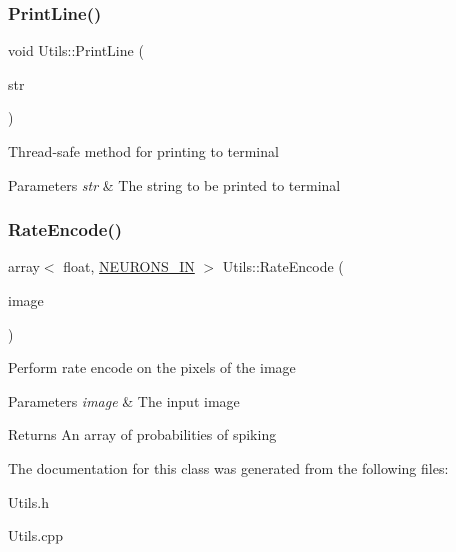 \subsubsection{\texorpdfstring{Print\+Line()}{PrintLine()}}
{\footnotesize\ttfamily void Utils\+::\+Print\+Line (\begin{DoxyParamCaption}\item[{string \&\&}]{str }\end{DoxyParamCaption})\hspace{0.3cm}{\ttfamily [static]}}

Thread-\/safe method for printing to terminal 
\begin{DoxyParams}{Parameters}
{\em str} & The string to be printed to terminal \\
\hline
\end{DoxyParams}
\mbox{\label{class_utils_a35864e66802eaecfd09f42b6bb6078d4}} 
\subsubsection{\texorpdfstring{Rate\+Encode()}{RateEncode()}}
{\footnotesize\ttfamily array$<$ float, \mbox{\hyperlink{_constants_8h_aefc2426e4681da445c7793c98a83c532}{N\+E\+U\+R\+O\+N\+S\+\_\+\+IN}} $>$ Utils\+::\+Rate\+Encode (\begin{DoxyParamCaption}\item[{array$<$ unsigned char, \mbox{\hyperlink{_constants_8h_aefc2426e4681da445c7793c98a83c532}{N\+E\+U\+R\+O\+N\+S\+\_\+\+IN}} $>$ \&}]{image }\end{DoxyParamCaption})\hspace{0.3cm}{\ttfamily [static]}}

Perform rate encode on the pixels of the image 
\begin{DoxyParams}{Parameters}
{\em image} & The input image \\
\hline
\end{DoxyParams}
\begin{DoxyReturn}{Returns}
An array of probabilities of spiking 
\end{DoxyReturn}


The documentation for this class was generated from the following files\+:\begin{DoxyCompactItemize}
\item 
Utils.\+h\item 
Utils.\+cpp\end{DoxyCompactItemize}
